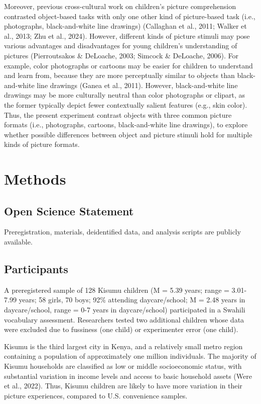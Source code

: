 \documentclass[10pt, letterpaper]{article}
\begin{document}
Moreover, previous cross-cultural work on children's picture
comprehension contrasted object-based tasks with only one other kind of
picture-based task (i.e., photographs, black-and-white line drawings)
(Callaghan et al., 2011; Walker et al., 2013; Zhu et al., 2024).
However, different kinds of picture stimuli may pose various advantages
and disadvantages for young children's understanding of pictures
(Pierroutsakos \& DeLoache, 2003; Simcock \& DeLoache, 2006). For
example, color photographs or cartoons may be easier for children to
understand and learn from, because they are more perceptually similar to
objects than black-and-white line drawings (Ganea et al., 2011).
However, black-and-white line drawings may be more culturally neutral
than color photographs or clipart, as the former typically depict fewer
contextually salient features (e.g., skin color). Thus, the present
experiment contrast objects with three common picture formats (i.e.,
photographs, cartoons, black-and-white line drawings), to explore
whether possible differences between object and picture stimuli hold for
multiple kinds of picture formats.

\section{Methods}\label{methods}

\subsection{Open Science Statement}\label{open-science-statement}

Preregistration, materials, deidentified data, and analysis scripts are
publicly available.

\subsection{Participants}\label{participants}

A preregistered sample of 128 Kisumu children (M = 5.39 years; range =
3.01-7.99 years; 58 girls, 70 boys; 92\% attending daycare/school; M =
2.48 years in daycare/school, range = 0-7 years in daycare/school)
participated in a Swahili vocabulary assessment. Researchers tested two
additional children whose data were excluded due to fussiness (one
child) or experimenter error (one child).

Kisumu is the third largest city in Kenya, and a relatively small metro
region containing a population of approximately one million individuals.
The majority of Kisumu households are classified as low or middle
socioeconomic status, with substantial variation in income levels and
access to basic household assets (Were et al., 2022). Thus, Kisumu
children are likely to have more variation in their picture experiences,
compared to U.S. convenience samples.
\end{document}
